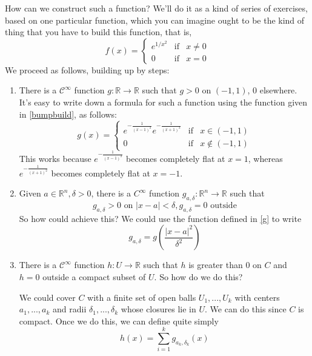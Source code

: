 \documentclass{article}
\newcommand{\reals}[0]{\mathbb{R}}
\newcommand{\mc}[1]{\mathcal{#1}}
\begin{document}
How can we construct such a function? We'll do it as a kind of series of exercises, based on one particular function, which you can imagine ought to be the kind of thing that you have to build this function, that is,
\begin{equation}
  f(x) = \left\{\begin{array}{ccc}
    e^{1/x^2} & \text{if} & x \neq 0 \\
    0 & \text{if} & x = 0
  \end{array}\right.
  \label{bumpbuild}
\end{equation}
We proceed as follows, building up by steps:
\begin{enumerate}

  \item There is a \(\mc{C}^\infty\) function \(g: \reals \to \reals\) such that \(g > 0\) on \((-1, 1)\), 0 elsewhere. It's easy to write down a formula for such a function using the function given in \ref{bumpbuild}, as follows:
  \begin{equation}
    g(x) = \left\{\begin{array}{ccc}
      e^{-\frac{1}{(x - 1)^2}}e^{-\frac{1}{(x + 1)^2}} & \text{if} & x \in (-1, 1) \\
      0 & \text{if} & x \notin (-1, 1)
    \end{array}\right.
    \label{g}
  \end{equation}
  This works because \(e^{-\frac{1}{(x - 1)^2}}\) becomes completely flat at \(x = 1\), whereas \(e^{-\frac{1}{(x + 1)^2}}\) becomes completely flat at \(x = -1\).

  \item Given \(a \in \reals^n, \delta > 0\), there is a \(C^\infty\) function \(g_{a, \delta}: \reals^n \to \reals\) such that
  \begin{equation}
    g_{a, \delta} > 0 \text{ on } |x - a| < \delta, g_{a, \delta} = 0 \text{ outside}
  \end{equation}
  So how could achieve this? We could use the function defined in \ref{g} to write
  \begin{equation}
    g_{a, \delta} = g\left(\frac{|x - a|^2}{\delta^2}\right)
  \end{equation}

  \item There is a \(\mc{C}^\infty\) function \(h: U \to \reals\) such that \(h\) is greater than 0 on \(C\) and \(h = 0\) outside a compact subset of \(U\). So how do we do this?

  We could cover \(C\) with a finite set of open balls \(U_1,...,U_k\) with centers \(a_1,...,a_k\) and radii \(\delta_1,...,\delta_k\) whose closures lie in \(U\). We can do this since \(C\) is compact. Once we do this, we can define quite simply
  \begin{equation}
    h(x) = \sum_{i = 1}^kg_{a_k, \delta_k}(x)
    \label{compactsum}
  \end{equation}


\end{enumerate}
\end{document}
